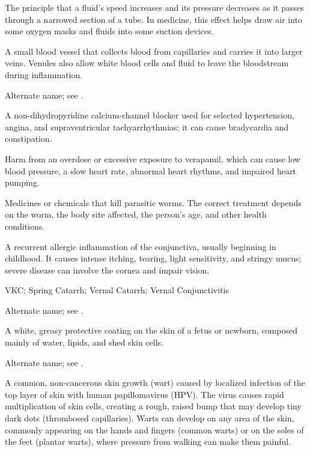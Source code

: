  The principle that a fluid's speed increases and its pressure decreases as it passes through a narrowed section of a tube. In medicine, this effect helps draw air into some oxygen masks and fluids into some suction devices.

 A small blood vessel that collects blood from capillaries and carries it into larger veins. Venules also allow white blood cells and fluid to leave the bloodstream during inflammation.

 Alternate name; see .

 A non-dihydropyridine calcium-channel blocker used for selected hypertension, angina, and supraventricular tachyarrhythmias; it can cause bradycardia and constipation.

 Harm from an overdose or excessive exposure to verapamil, which can cause low blood pressure, a slow heart rate, abnormal heart rhythms, and impaired heart pumping.

 Medicines or chemicals that kill parasitic worms. The correct treatment depends on the worm, the body site affected, the person’s age, and other health conditions.

 A recurrent allergic inflammation of the conjunctiva, usually beginning in childhood. It causes intense itching, tearing, light sensitivity, and stringy mucus; severe disease can involve the cornea and impair vision.

\synonyms
VKC; Spring Catarrh; Vernal Catarrh; Vernal Conjunctivitis

 Alternate name; see .

 A white, greasy protective coating on the skin of a fetus or newborn, composed mainly of water, lipids, and shed skin cells.

 Alternate name; see .

 A common, non-cancerous skin growth (wart) caused by localized infection of the top layer of skin with human papillomavirus (HPV). The virus causes rapid multiplication of skin cells, creating a rough, raised bump that may develop tiny dark dots (thrombosed capillaries). Warts can develop on any area of the skin, commonly appearing on the hands and fingers (common warts) or on the soles of the feet (plantar warts), where pressure from walking can make them painful.

